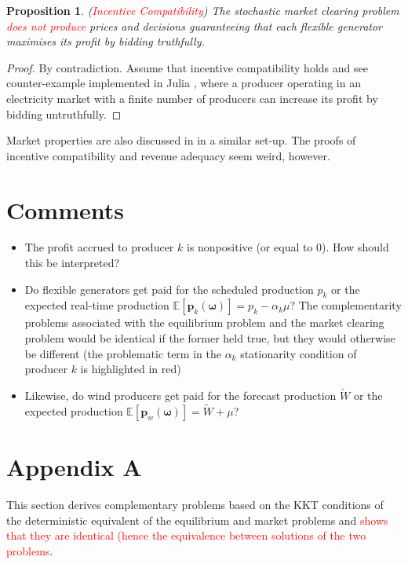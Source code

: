 \documentclass{article}
\newtheorem{proposition}{Proposition}
\begin{document}
\begin{proposition}
(\textcolor{red}{Incentive Compatibility}) The stochastic market clearing problem \textcolor{red}{does not produce} prices and decisions guaranteeing that each flexible generator maximises its profit by bidding truthfully.
\end{proposition}
\begin{proof}
By contradiction. Assume that incentive compatibility holds and see counter-example implemented in Julia \cite{SMER2022}, where a producer operating in an electricity market with a finite number of producers can increase its profit by bidding untruthfully.
\end{proof}

Market properties are also discussed in \cite{Ratha2019} in a similar set-up. The proofs of incentive compatibility and revenue adequacy seem weird, however.

\section{Comments}

\begin{itemize} 
\item The profit accrued to producer $k$ is nonpositive (or equal to 0). How should this be interpreted?
\item Do flexible generators get paid for the scheduled production $p_k$ or the expected real-time production $\mathbb{E}[\mathbf{p}_k(\boldsymbol{\omega})] = p_k - \alpha_k \mu$? The complementarity problems associated with the equilibrium problem and the market clearing problem would be identical if the former held true, but they would otherwise be different (the problematic term in the $\alpha_k$ stationarity condition of producer $k$ is highlighted in red)
\item Likewise, do wind producers get paid for the forecast production $\tilde{W}$ or the expected production $\mathbb{E}[\mathbf{p}_w(\boldsymbol{\omega})] = \tilde{W} + \mu$?
\end{itemize}

\section*{Appendix A}
This section derives complementary problems based on the KKT conditions of the deterministic equivalent of the equilibrium and market problems and \textcolor{red}{shows that they are identical (hence the equivalence between solutions of the two problems}.
\end{document}
